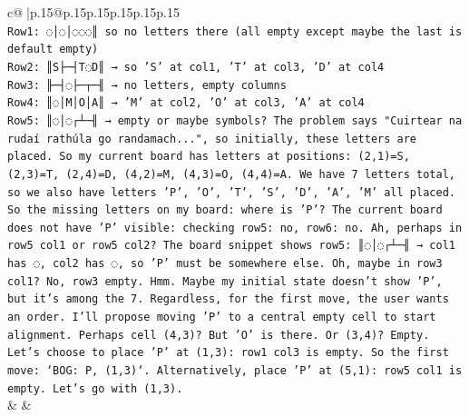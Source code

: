 \documentclass{article}
\begin{document}
{\begin{supertabular}{c@{$\;$}|p{.15\linewidth}@{}p{.15\linewidth}p{.15\linewidth}p{.15\linewidth}p{.15\linewidth}p{.15\linewidth}}
{{{\\ 
\texttt{Row1: ◌│◌│◌◌◌║ so no letters there (all empty except maybe the last is default empty)} \\
\texttt{Row2: ║S├─┤T◌D║ → so 'S' at col1, 'T' at col3, 'D' at col4} \\
\texttt{Row3: ╟─┤◌├─┬─╢ → no letters, empty columns} \\
\texttt{Row4: ║◌│M│O│A║ → 'M' at col2, 'O' at col3, 'A' at col4} \\
\texttt{Row5: ║◌│◌┌┴─╢ → empty or maybe symbols? The problem says "Cuirtear na rudaí rathúla go randamach...", so initially, these letters are placed. So my current board has letters at positions: (2,1)=S, (2,3)=T, (2,4)=D, (4,2)=M, (4,3)=O, (4,4)=A. We have 7 letters total, so we also have letters 'P', 'O', 'T', 'S', 'D', 'A', 'M' all placed. So the missing letters on my board: where is 'P'? The current board does not have 'P' visible: checking row5: no, row6: no. Ah, perhaps in row5 col1 or row5 col2? The board snippet shows row5: ║◌│◌┌┴─╢ → col1 has ◌, col2 has ◌, so 'P' must be somewhere else. Oh, maybe in row3 col1? No, row3 empty. Hmm. Maybe my initial state doesn't show 'P', but it's among the 7. Regardless, for the first move, the user wants an order. I'll propose moving 'P' to a central empty cell to start alignment. Perhaps cell (4,3)? But 'O' is there. Or (3,4)? Empty. Let's choose to place 'P' at (1,3): row1 col3 is empty. So the first move: `BOG: P, (1,3)`. Alternatively, place 'P' at (5,1): row5 col1 is empty. Let's go with (1,3).} \\
            }
        }
    }
    & & \\ \\


\end{supertabular}}
\end{document}
